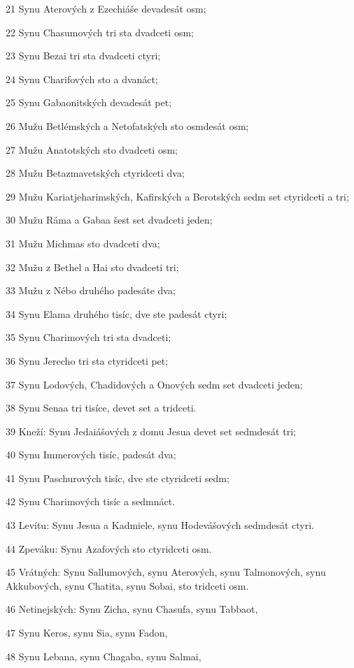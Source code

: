 \par 21 Synu Aterových z Ezechiáše devadesát osm;
\par 22 Synu Chasumových tri sta dvadceti osm;
\par 23 Synu Bezai tri sta dvadceti ctyri;
\par 24 Synu Charifových sto a dvanáct;
\par 25 Synu Gabaonitských devadesát pet;
\par 26 Mužu Betlémských a Netofatských sto osmdesát osm;
\par 27 Mužu Anatotských sto dvadceti osm;
\par 28 Mužu Betazmavetských ctyridceti dva;
\par 29 Mužu Kariatjeharimských, Kafirských a Berotských sedm set ctyridceti a tri;
\par 30 Mužu Ráma a Gabaa šest set dvadceti jeden;
\par 31 Mužu Michmas sto dvadceti dva;
\par 32 Mužu z Bethel a Hai sto dvadceti tri;
\par 33 Mužu z Nébo druhého padesáte dva;
\par 34 Synu Elama druhého tisíc, dve ste padesát ctyri;
\par 35 Synu Charimových tri sta dvadceti;
\par 36 Synu Jerecho tri sta ctyridceti pet;
\par 37 Synu Lodových, Chadidových a Onových sedm set dvadceti jeden;
\par 38 Synu Senaa tri tisíce, devet set a tridceti.
\par 39 Kneží: Synu Jedaiášových z domu Jesua devet set sedmdesát tri;
\par 40 Synu Immerových tisíc, padesát dva;
\par 41 Synu Paschurových tisíc, dve ste ctyridceti sedm;
\par 42 Synu Charimových tisíc a sedmnáct.
\par 43 Levítu: Synu Jesua a Kadmiele, synu Hodevášových sedmdesát ctyri.
\par 44 Zpeváku: Synu Azafových sto ctyridceti osm.
\par 45 Vrátných: Synu Sallumových, synu Aterových, synu Talmonových, synu Akkubových, synu Chatita, synu Sobai, sto tridceti osm.
\par 46 Netinejských: Synu Zicha, synu Chasufa, synu Tabbaot,
\par 47 Synu Keros, synu Sia, synu Fadon,
\par 48 Synu Lebana, synu Chagaba, synu Salmai,
